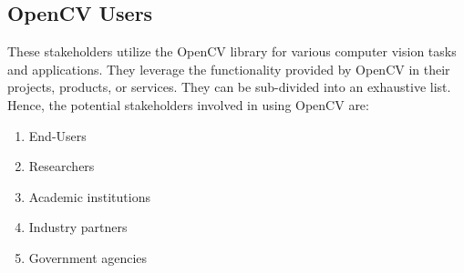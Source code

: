  \subsection{OpenCV Users \label{subSection::OpenCVUsers}}
These stakeholders utilize the OpenCV library for various computer vision tasks and applications. They leverage the functionality provided by OpenCV in their projects, products, or services. They can be sub-divided into an exhaustive list. Hence, the potential stakeholders involved in using OpenCV are:
\begin{enumerate}
     \item End-Users
     \item Researchers
     \item Academic institutions
     \item Industry partners
     \item Government agencies
 \end{enumerate}
 
